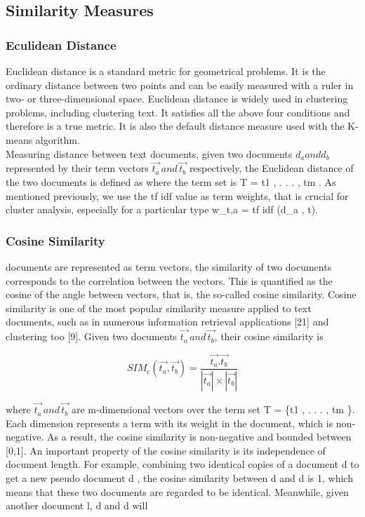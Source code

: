 \subsection{Similarity Measures}
\subsubsection{Eculidean Distance}
Euclidean distance is a standard metric for geometrical problems. It is the ordinary distance between two points and can be easily measured with a ruler in two- or three-dimensional space. Euclidean distance is widely used in clustering problems, including clustering text. It satisfies all the above four conditions and therefore is a true metric. It is also the default distance measure used with the K-means algorithm.\\
Measuring distance between text documents, given two documents $d_{a} and  d_{b}$ represented by their term vectors  $\overrightarrow{t_{a}} \,and\, \overrightarrow{t_{b}}$ respectively, the Euclidean distance of the two documents is defined as
where the term set is T = {t1 , . . . , tm }. As mentioned previously, we use the tf idf value as term weights, that is
crucial for cluster analysis, especially for a particular type w_{t,a} = tf idf (d_{a} , t).


\subsubsection{Cosine Similarity}
\When documents are represented as term vectors, the similarity of two documents corresponds to the correlation between the vectors. This is quantified as the cosine of the angle between vectors, that is, the so-called cosine similarity. Cosine similarity is one of the most popular similarity measure applied to text documents, such as in numerous information retrieval applications [21] and clustering too [9].
Given two documents $\overrightarrow{t_{a}} \,and\, \overrightarrow{t_{b}}$, their cosine similarity is

\begin{equation}
SIM_{c}(\vec{t_{a}},\vec{t_{b}}) =\frac{\vec{t_{a}}.\vec{t_{b}}}{|\vec{t_{a}}|\times|\vec{t_{b}}|}
\end{equation}

where $\overrightarrow{t_{a}} \,and\, \overrightarrow{t_{b}}$ are m-dimensional vectors over the term set T = \{t1 , . . . , tm \}. Each dimension represents a term with its weight in the document, which is non-negative. As a result, the cosine similarity is non-negative and bounded between [0,1].
An important property of the cosine similarity is its independence of document length. For example, combining two identical copies of a document d to get a new pseudo document d , the cosine similarity between d and d is 1, which means that these two documents are regarded to be identical. Meanwhile, given another document l, d and d will



